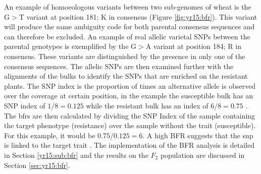 An example of homoeologous variants between two sub-genomes of wheat is the G$>$T variant at position 181; K in consensus (Figure \ref{fig:yr15:bfr}). This variant will produce the same ambiguity code for both parental consensus sequences and can therefore be excluded. 
An example of real allelic varietal SNPs between the parental genotypes is exemplified by the G$>$A variant at position 184; R in consensus. These variants are distinguished by the presence in only one of the consensus sequences. 
The allelic SNPs are then examined further with the alignments of the bulks to identify the SNPs that are enriched on the resistant plants.
The SNP index is the proportion of times an alternative allele is observed over the coverage at certain position, in the example the susceptible bulk has an SNP index of $1/8=0.125$ while the resistant bulk has an index of $6/8=0.75$ \citep{Takagi2013a}. 
The \glspl{bfr} are then calculated by dividing the SNP Index of the sample containing the target phenotype (resistance) over the sample without the trait (susceptible). For this example, it would be $0.75/0.125=6$.  
A high BFR suggests that the \acrshort{snp} is linked to the target trait \citep{Trick2012}. 
The implementation of the BFR analysis is detailed in Section \ref{yr15:sub:bfr} and the results on the $F_2$ population are discussed in Section \ref{sec:yr15:bfr}. 

